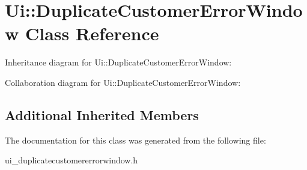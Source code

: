\section{Ui\+:\+:Duplicate\+Customer\+Error\+Window Class Reference}
\label{class_ui_1_1_duplicate_customer_error_window}


Inheritance diagram for Ui\+:\+:Duplicate\+Customer\+Error\+Window\+:


Collaboration diagram for Ui\+:\+:Duplicate\+Customer\+Error\+Window\+:
\subsection*{Additional Inherited Members}


The documentation for this class was generated from the following file\+:\begin{DoxyCompactItemize}
\item 
ui\+\_\+duplicatecustomererrorwindow.\+h\end{DoxyCompactItemize}
